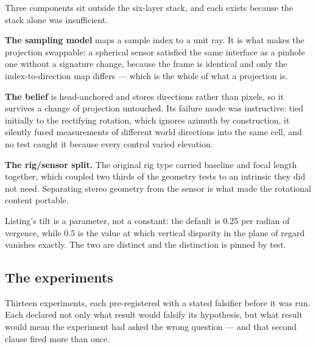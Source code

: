 Three components sit outside the six-layer stack, and each exists because the
stack alone was insufficient.

\textbf{The sampling model} maps a sample index to a unit ray. It is what makes
the projection swappable: a spherical sensor satisfied the same interface as a
pinhole one without a signature change, because the frame is identical and only
the index-to-direction map differs --- which is the whole of what a projection
is.

\textbf{The belief} is head-anchored and stores directions rather than pixels,
so it survives a change of projection untouched. Its failure mode was
instructive: tied initially to the rectifying rotation, which ignores azimuth by
construction, it silently fused measurements of different world directions into
the same cell, and no test caught it because every control varied elevation.

\textbf{The rig/sensor split.} The original rig type carried baseline and focal
length together, which coupled two thirds of the geometry tests to an intrinsic
they did not need. Separating stereo geometry from the sensor is what made the
rotational content portable.

Listing's tilt is a parameter, not a constant: the default is 0.25 per radian of
vergence, while 0.5 is the value at which vertical disparity in the plane of
regard vanishes exactly. The two are distinct and the distinction is pinned by
test.

\subsection{The experiments}

Thirteen experiments, each pre-registered with a stated falsifier before it was
run. Each declared not only what result would falsify its hypothesis, but what
result would mean the experiment had asked the wrong question --- and that
second clause fired more than once.

